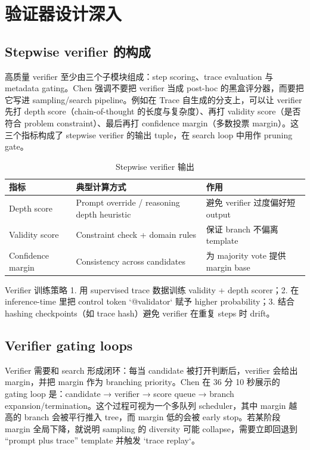 \section{验证器设计深入}

\subsection{Stepwise verifier 的构成}
高质量 verifier 至少由三个子模块组成：step scoring、trace evaluation 与 metadata gating。Chen 强调不要把 verifier 当成 post-hoc 的黑盒评分器，而要把它写进 sampling/search pipeline。例如在 Trace 自生成的分支上，可以让 verifier 先打 depth score（chain-of-thought 的长度与复杂度）、再打 validity score（是否符合 problem constraint）、最后再打 confidence margin（多数投票 margin）。这三个指标构成了 stepwise verifier 的输出 tuple，在 search loop 中用作 pruning gate。

\begin{table}[H]
\centering
\caption{Stepwise verifier 输出}
\begin{tabular}{p{}p{}p{}}
\toprule
指标 & 典型计算方式 & 作用 \\
\midrule
Depth score & Prompt override / reasoning depth heuristic & 避免 verifier 过度偏好短 output \\
Validity score & Constraint check + domain rules & 保证 branch 不偏离 template \\
Confidence margin & Consistency across candidates & 为 majority vote 提供 margin base \\
\bottomrule
\end{tabular}
\end{table}

\begin{knowledgebox}{Verifier 训练策略}
1. 用 supervised trace 数据训练 validity + depth scorer；2. 在 inference-time 里把 control token `{@validator}` 赋予 higher probability；3. 结合 hashing checkpoints（如 trace hash）避免 verifier 在重复 steps 时 drift。
\end{knowledgebox}

\subsection{Verifier gating loops}
Verifier 需要和 search 形成闭环：每当 candidate 被打开判断后，verifier 会给出 margin，并把 margin 作为 branching priority。Chen 在 36 分 10 秒展示的 gating loop 是：candidate → verifier → score queue → branch expansion/termination。这个过程可视为一个多队列 scheduler，其中 margin 越高的 branch 会被平行推入 tree，而 margin 低的会被 early stop。若某阶段 margin 全局下降，就说明 sampling 的 diversity 可能 collapse，需要立即回退到 “prompt plus trace” template 并触发 `trace replay`。

